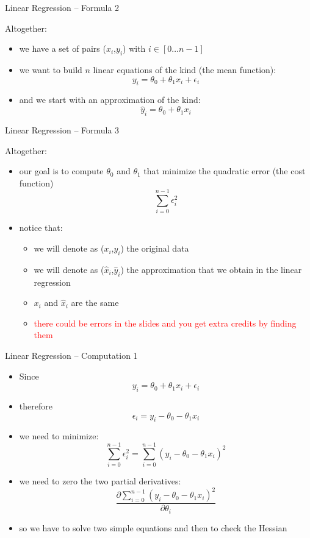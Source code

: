 \documentclass{beamer}
\begin{document}
\begin{frame}
{\centerline{Linear Regression -- Formula 2}}
Altogether:
\begin{itemize}
\item we have a set of pairs ($x_i$,$y_i$)  with $i \in [0 \ldots{} n-1]$
\item we want to build $n$ linear equations of the kind (the mean function):
$$ y_i = \theta_0 + \theta_1 x_i + \epsilon_i $$
\item and we start with an approximation of the kind:
$$ \hat{y}_i = \theta_0 + \theta_1 x_i  $$
\end{itemize}

\end{frame}

\begin{frame}
{\centerline{Linear Regression -- Formula 3}}
Altogether:
\begin{itemize}
\item our goal is to compute  $\theta_0$ and $\theta_1$ that minimize the quadratic error (the cost function)
$$ \sum_{i=0}^{n-1}\epsilon_i^2  $$

\item notice that:
\begin{itemize}
\item we will denote as ($x_i$,$y_i$) the original data
\item we will denote as ($\hat{x}_i$,$\hat{y}_i$) the approximation that we obtain in the linear regression
\item $x_i$ and $\hat{x}_i$ are the same
\item \textcolor{red}{there could be errors in the slides and you get extra credits by finding them}
\end{itemize}
\end{itemize}

\end{frame}


\begin{frame}
{\centerline{Linear Regression -- Computation 1}}
\begin{itemize}
\item Since 
$$ y_i = \theta_0 + \theta_1 x_i + \epsilon_i $$
\item therefore
$$\epsilon_i  = y_i - \theta_0 - \theta_1 x_i $$
\item we need to minimize:
$$ \sum_{i=0}^{n-1}\epsilon_i^2  = \sum_{i=0}^{n-1}(y_i - \theta_0 - \theta_1 x_i)^2  $$
\item we need to zero the two partial derivatives:
$$ \frac{\partial \sum_{i=0}^{n-1}(y_i - \theta_0 - \theta_1 x_i)^2}{\partial \theta_i}$$
\item so we have to solve two simple equations and then to check the Hessian
\end{itemize}

\end{frame}
\end{document}
